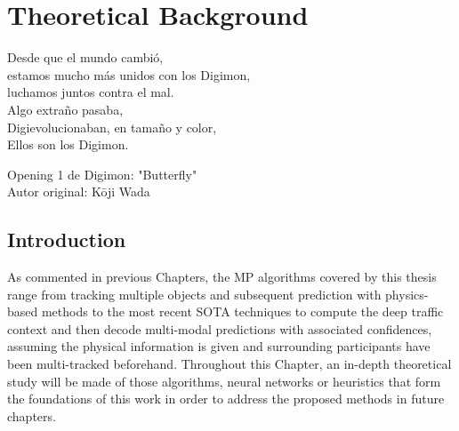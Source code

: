 % 
% 
% 
% 
% 
% 
% 

\chapter{Theoretical Background}
\label{cha:theoretical_background}

\begin{FraseCelebre}
	\begin{Frase}
		Desde que el mundo cambió, \\
		estamos mucho más unidos con los Digimon, \\
		luchamos juntos contra el mal. \\ 

		Algo extraño pasaba, \\
		Digievolucionaban, en tamaño y color, \\
		Ellos son los Digimon. 
	\end{Frase}
	\begin{Fuente}
		Opening 1 de Digimon: "Butterfly" \\
		Autor original: Kōji Wada
	\end{Fuente}
\end{FraseCelebre}

\section{Introduction}
\label{sec:3_introduction}

As commented in previous Chapters, the \ac{MP} algorithms covered by this thesis range from tracking multiple objects and subsequent prediction with physics-based methods to the most recent \ac{SOTA} techniques to compute the deep traffic context and then decode multi-modal predictions with associated confidences, assuming the physical information is given and surrounding participants have been multi-tracked beforehand. Throughout this Chapter, an in-depth theoretical study will be made of those algorithms, neural networks or heuristics that form the foundations of this work in order to address the proposed methods in future chapters.

